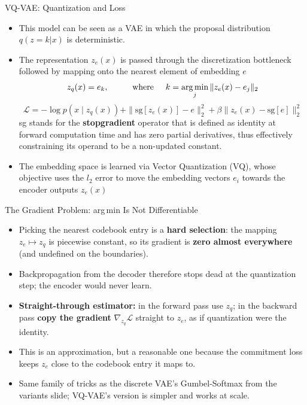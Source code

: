 \begin{frame}[allowframebreaks]{VQ-VAE: Quantization and Loss}
\begin{itemize}
    \item  This model can be seen as a VAE in which the proposal distribution $q(z = k|x)$ is deterministic.
    \item The representation $z_e(x)$ is passed through the discretization bottleneck followed by mapping onto the nearest element of embedding $e$\\
    \[ z_q(x) = e_k, \hspace{1cm} \text{where} \hspace{0.5cm} k = \operatorname*{arg\,min}_j \|z_e(x) - e_j\|_2 \]
    \[ \mathcal{L} = -\log p(x \mid z_q(x)) + \|\mathrm{sg}[z_e(x)] - e\|^2_2 + \beta \|z_e(x) - \mathrm{sg}[e]\|_2^2 \]
    sg stands for the \textbf{stopgradient} operator that is defined as identity at forward computation time and has zero partial derivatives, thus effectively constraining its operand to be a non-updated constant.
    \item The embedding space is learned via Vector Quantization (VQ), whose objective uses the $l_2$ error to move the embedding vectors $e_i$ towards the encoder outputs $z_e(x)$

\end{itemize}
\end{frame}

\begin{frame}{The Gradient Problem: arg\,min Is Not Differentiable}
\begin{itemize}
    \item Picking the nearest codebook entry is a \textbf{hard selection}: the mapping $z_e \mapsto z_q$ is piecewise constant, so its gradient is \textbf{zero almost everywhere} (and undefined on the boundaries).
    \item Backpropagation from the decoder therefore stops dead at the quantization step; the encoder would never learn.
    \item \textbf{Straight-through estimator:} in the forward pass use $z_q$; in the backward pass \textbf{copy the gradient} $\nabla_{z_q} \mathcal{L}$ straight to $z_e$, as if quantization were the identity.
    \item This is an approximation, but a reasonable one because the commitment loss keeps $z_e$ close to the codebook entry it maps to.
    \item Same family of tricks as the discrete VAE's Gumbel-Softmax from the variants slide; VQ-VAE's version is simpler and works at scale.
\end{itemize}
\end{frame}

